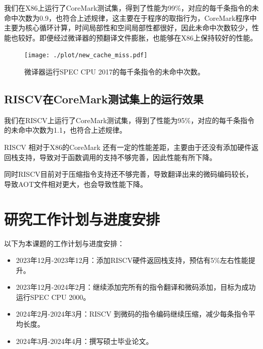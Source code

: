 \documentclass{Style/ucasproposal}%
\begin{document}
我们在X86上运行了CoreMark测试集，得到了性能为99\%，对应的每千条指令的未命中次数为0.9，也符合上述规律，这主要在于程序的取指行为，CoreMark程序中主要为核心循环计算，时间局部性和空间局部性都很好，因此未命中次数较少，性能也较好。即便经过微译器的预翻译文件膨胀，也能够在X86上保持较好的性能。

\begin{figure}[h]
  \centering
  \texttt{[image: ./plot/new\_cache\_miss.pdf]}
  \caption{微译器运行SPEC CPU 2017的每千条指令的未命中次数。}
  \label{img:new_cache_miss}
\end{figure}

\subsection{RISCV在CoreMark测试集上的运行效果}

我们在RISCV上运行了CoreMark测试集，得到了性能为95\%，对应的每千条指令的未命中次数为1.1，也符合上述规律。

RISCV 相对于X86的CoreMark 还有一定的性能差距，主要由于还没有添加硬件返回栈支持，导致对于函数调用的支持不够完善，因此性能有所下降。

同时RISCV目前对于压缩指令支持还不够完善，导致翻译出来的微码编码较长，导致AOT文件相对更大，也会导致性能下降。

\section{研究工作计划与进度安排}

以下为本课题的工作计划与进度安排：

\begin{itemize}
  \item 2023年12月-2023年12月：添加RISCV硬件返回栈支持，预估有5\%左右性能提升。
  \item 2023年12月-2024年2月：继续添加完所有的指令翻译和微码添加，目标为成功运行SPEC CPU 2000。
  \item 2024年2月-2024年3月：RISCV 到微码的指令编码继续压缩，减少每条指令平均长度。
  \item 2024年3月-2024年4月：撰写硕士毕业论文。
\end{itemize}





\end{document}

